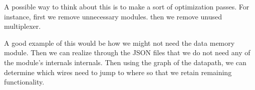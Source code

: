 \documentclass[]{article}
\begin{document}
	A possible way to think about this is to make a sort of optimization passes. For instance, first we remove unnecessary modules.
	then we remove unused multiplexer.

	A good example of this would be how we might not need the data memory module. Then we can realize through the JSON files that we do not need any of the module's internals internals.
	Then using the graph of the datapath, we can determine which wires need to jump to where so that we retain remaining functionality.
\end{document}
